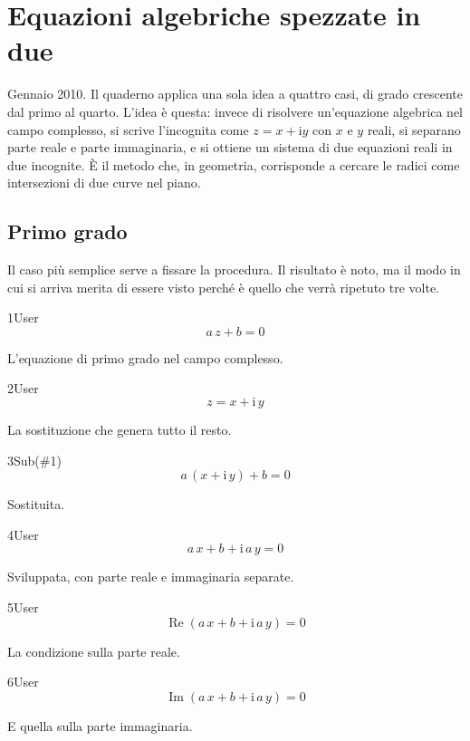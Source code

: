 \chapter{Equazioni algebriche spezzate in due}
\label{cap:equazioni}

Gennaio 2010. Il quaderno applica una sola idea a quattro casi, di grado crescente dal primo al quarto. L'idea è questa: invece di risolvere un'equazione algebrica nel campo complesso, si scrive l'incognita come $z=x+\mathrm{i}y$ con $x$ e $y$ reali, si separano parte reale e parte immaginaria, e si ottiene un sistema di due equazioni reali in due incognite. È il metodo che, in geometria, corrisponde a cercare le radici come intersezioni di due curve nel piano.

\section{Primo grado}

Il caso più semplice serve a fissare la procedura. Il risultato è noto, ma il modo in cui si arriva merita di essere visto perché è quello che verrà ripetuto tre volte.

\begin{espr}{1}{User}{}
\[
a\, z + b = 0
\]
\end{espr}
L'equazione di primo grado nel campo complesso.

\begin{espr}{2}{User}{}
\[
z = x + \mathrm{i}\, y
\]
\end{espr}
La sostituzione che genera tutto il resto.

\begin{espr}{3}{Sub(\#1)}{}
\[
a\, \left(x + \mathrm{i}\, y\right) + b = 0
\]
\end{espr}
Sostituita.

\begin{espr}{4}{User}{}
\[
a\, x + b + \mathrm{i}\, a\, y = 0
\]
\end{espr}
Sviluppata, con parte reale e immaginaria separate.

\begin{espr}{5}{User}{}
\[
\operatorname{Re}\!\left(a\, x + b + \mathrm{i}\, a\, y\right) = 0
\]
\end{espr}
La condizione sulla parte reale.

\begin{espr}{6}{User}{}
\[
\operatorname{Im}\!\left(a\, x + b + \mathrm{i}\, a\, y\right) = 0
\]
\end{espr}
E quella sulla parte immaginaria.

